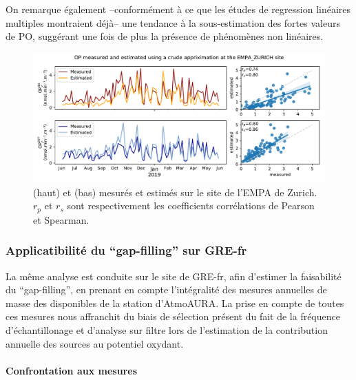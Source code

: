 On remarque également --conformément à ce que les études de regression linéaires
multiples montraient déjà-- une tendance à la sous-estimation des fortes valeurs de PO,
suggérant une fois de plus la présence de phénomènes non linéaires.

\begin{figure}[ht]
    \centering
    \includegraphics[width=1.0\linewidth]{figures/chapter05/pyopestimator_EMPA_ZURICH.pdf}
    \caption{\POAAv{} (haut) et \PODTTv{} (bas) mesurés et estimés sur le site de l'EMPA
    de Zurich. $r_p$ et $r_s$ sont respectivement les coefficients corrélations de Pearson
et Spearman.}
    \label{fig:figures/chapter05/pyopestimator_EMPA_ZURICH}
\end{figure}

%  

\subsubsection{Applicatibilité du ``gap-filling'' sur GRE-fr}

La même analyse est conduite sur le site de GRE-fr, afin d'estimer la faisabilité du
``gap-filling'', en prenant en compte l'intégralité des mesures annuelles de masse des
\PMdix{} disponibles de la station d'AtmoAURA. La prise en compte de toutes ces mesures
nous affranchit du biais de sélection présent du fait de la fréquence d'échantillonage et
d'analyse sur filtre lors de l'estimation de la contribution annuelle des sources au
potentiel oxydant.

\paragraph{Confrontation aux mesures}%
\label{par:confrontation_aux_mesures}


